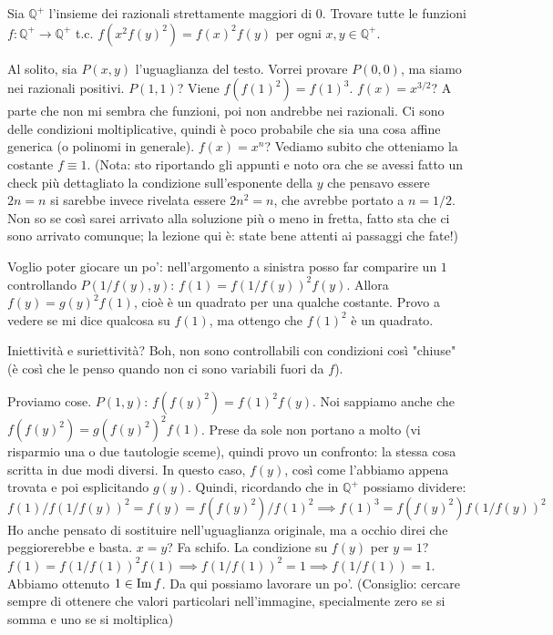 \begin{prob}
  Sia $\mathbb{Q}^+$ l'insieme dei razionali strettamente maggiori di $0$. Trovare tutte le funzioni $f: \mathbb{Q}^+ \longrightarrow \mathbb{Q}^+$ t.c. $f(x^2f(y)^2)=f(x)^2f(y)$ per ogni $x, y \in \mathbb{Q}^+$.
\end{prob}

\begin{sol}
  Al solito, sia $P(x,y)$ l'uguaglianza del testo. Vorrei provare $P(0,0)$, ma siamo nei razionali positivi. $P(1,1)$? Viene $f(f(1)^2)=f(1)^3$. $f(x)=x^{3/2}$? A parte che non mi sembra che funzioni, poi non andrebbe nei razionali. Ci sono delle condizioni moltiplicative, quindi è poco probabile che sia una cosa affine generica (o polinomi in generale). $f(x)=x^n$? Vediamo subito che otteniamo la costante $f \equiv 1$. (Nota: sto riportando gli appunti e noto ora che se avessi fatto un check più dettagliato la condizione sull'esponente della $y$ che pensavo essere $2n=n$ si sarebbe invece rivelata essere $2n^2=n$, che avrebbe portato a $n=1/2$. Non so se così sarei arrivato alla soluzione più o meno in fretta, fatto sta che ci sono arrivato comunque; la lezione qui è: state bene attenti ai passaggi che fate!)

  Voglio poter giocare un po': nell'argomento a sinistra posso far comparire un $1$ controllando $P(1/f(y),y)$: $f(1)=f(1/f(y))^2f(y)$. Allora $f(y)=g(y)^2f(1)$, cioè è un quadrato per una qualche costante. Provo a vedere se mi dice qualcosa su $f(1)$, ma ottengo che $f(1)^2$ è un quadrato.

  Iniettività e suriettività? Boh, non sono controllabili con condizioni così "chiuse" (è così che le penso quando non ci sono variabili fuori da $f$).

  Proviamo cose. $P(1,y)$: $f(f(y)^2)=f(1)^2f(y)$. Noi sappiamo anche che $f(f(y)^2)=g(f(y)^2)^2f(1)$. Prese da sole non portano a molto (vi risparmio una o due tautologie sceme), quindi provo un confronto: la stessa cosa scritta in due modi diversi. In questo caso, $f(y)$, così come l'abbiamo appena trovata e poi esplicitando $g(y)$. Quindi, ricordando che in $\mathbb{Q}^+$ possiamo dividere:
  $$f(1)/f(1/f(y))^2=f(y)=f(f(y)^2)/f(1)^2 \implies f(1)^3=f(f(y)^2)f(1/f(y))^2$$
  Ho anche pensato di sostituire nell'uguaglianza originale, ma a occhio direi che peggiorerebbe e basta. $x=y$? Fa schifo. La condizione su $f(y)$ per $y=1$? $f(1)=f(1/f(1))^2f(1) \implies f(1/f(1))^2=1 \implies f(1/f(1))=1$. Abbiamo ottenuto $1 \in \operatorname{Im}{f}$. Da qui possiamo lavorare un po'. (Consiglio: cercare sempre di ottenere che valori particolari nell'immagine, specialmente zero se si somma e uno se si moltiplica)


\end{sol}
